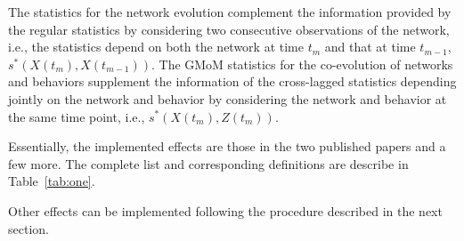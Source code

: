 \documentclass[a4paper,11pt]{article}
\begin{document}
The statistics for the network evolution complement the information provided by the regular statistics by considering two consecutive observations of the network, i.e., the statistics depend on both the network at time $t_m$ and that at time $t_{m-1}$, $s^{*}(X(t_m),X(t_{m-1}))$. The GMoM statistics for the co-evolution of networks and behaviors supplement the information of the cross-lagged statistics depending jointly on the network and behavior by considering the network and behavior at the same time point, i.e., $s^{*}(X(t_m),Z(t_{m}))$.

Essentially, the implemented effects are those in the two published papers and a few more. The complete list and corresponding definitions are describe in Table~\ref{tab:one}.

Other effects can be implemented following the procedure described in the next section.
\end{document}
